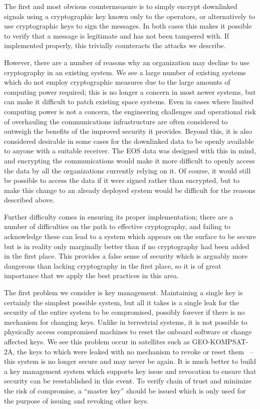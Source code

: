 The first and most obvious countermeasure is to simply encrypt downlinked signals using a cryptographic key known only to the operators, or alternatively to use cryptographic keys to sign the messages.
In both cases this makes it possible to verify that a message is legitimate and has not been tampered with.
If implemented properly, this trivially counteracts the attacks we describe.

However, there are a number of reasons why an organization may decline to use cryptography in an existing system.
We see a large number of existing systems which do not employ cryptographic measures due to the large amounts of computing power required; this is no longer a concern in most newer systems, but can make it difficult to patch existing space systems.
Even in cases where limited computing power is not a concern, the engineering challenges and operational risk of overhauling the communications infrastructure are often considered to outweigh the benefits of the improved security it provides.
Beyond this, it is also considered desirable in some cases for the downlinked data to be openly available to anyone with a suitable receiver.
The EOS data was designed with this in mind, and encrypting the communications would make it more difficult to openly access the data by all the organizations currently relying on it.
Of course, it would still be possible to access the data if it were signed rather than encrypted, but to make this change to an already deployed system would be difficult for the reasons described above.

Further difficulty comes in ensuring its proper implementation; there are a number of difficulties on the path to effective cryptography, and failing to acknowledge these can lead to a system which appears on the surface to be secure but is in reality only marginally better than if no cryptography had been added in the first place.
This provides a false sense of security which is arguably more dangerous than lacking cryptography in the first place, so it is of great importance that we apply the best practices in this area.

The first problem we consider is key management.
Maintaining a single key is certainly the simplest possible system, but all it takes is a single leak for the security of the entire system to be compromised, possibly forever if there is no mechanism for changing keys.
Unlike in terrestrial systems, it is not possible to physically access compromised machines to reset the onboard software or change affected keys.
We see this problem occur in satellites such as GEO-KOMPSAT-2A, the keys to which were leaked with no mechanism to revoke or reset them~\cite{xrit-rx} -- this system is no longer secure and may never be again.
It is much better to build a key management system which supports key issue and revocation to ensure that security can be reestablished in this event.
To verify chain of trust and minimize the risk of compromise, a ``master key'' should be issued which is only used for the purpose of issuing and revoking other keys.

